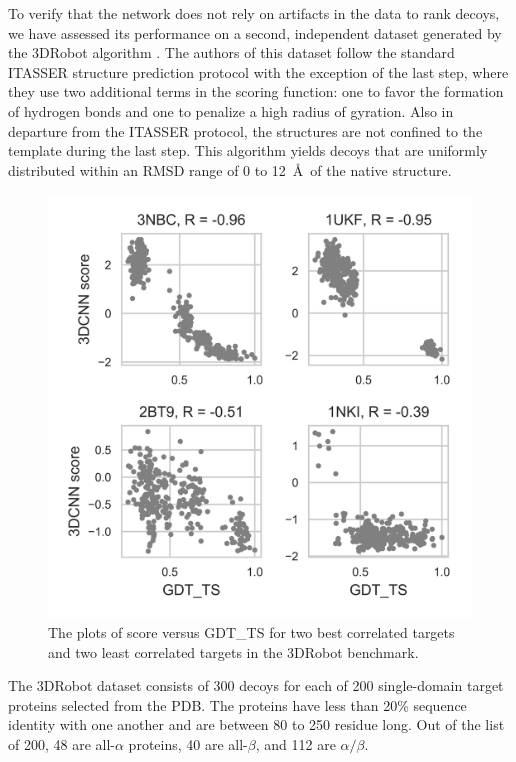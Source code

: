 \documentclass{bioinfo}
\begin{document}
To verify that the network does not rely on artifacts in the data to
rank decoys, we have assessed its performance on a second, independent
dataset generated by the 3DRobot algorithm \citep{deng20163drobot}.
The authors of this dataset follow the standard ITASSER structure
prediction protocol \citep{REF_ITASSER???} with the exception of the
last step, where they use two additional terms in the scoring
function: one to favor the formation of hydrogen bonds and one to
penalize a high radius of gyration. Also in departure from the ITASSER
protocol, the structures are not confined to the template during the
last step. This algorithm yields decoys that are uniformly distributed
within an RMSD range of 0 to 12~\AA\ of the native structure.
%
\begin{figure}
    \centering
    \includegraphics[width=\linewidth]{image8}
    \caption{The plots of score versus GDT\_TS for two best correlated targets and two
    least correlated targets in the 3DRobot benchmark.}
    \label{Fig:3DRobotBenchmark}
\end{figure}
%
The 3DRobot dataset consists of 300 decoys for each of 200
single-domain target proteins selected from the PDB. The proteins have
less than 20\% sequence identity with one another and are between 80
to 250 residue long. Out of the list of 200, 48 are all-$\alpha$
proteins, 40 are all-$\beta$, and 112 are $\alpha/\beta$.
\end{document}

